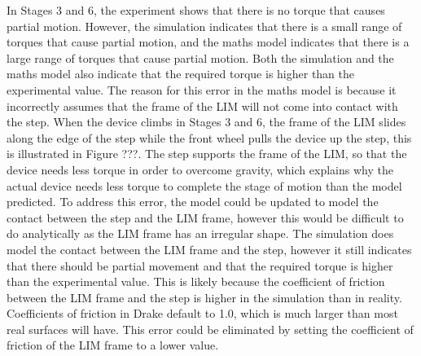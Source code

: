 In Stages 3 and 6, the experiment shows that there is no torque that causes partial motion. However, the simulation indicates that there is a small range of torques that cause partial motion, and the maths model indicates that there is a large range of torques that cause partial motion. Both the simulation and the maths model also indicate that the required torque is higher than the experimental value. The reason for this error in the maths model is because it incorrectly assumes that the frame of the LIM will not come into contact with the step. When the device climbs in Stages 3 and 6, the frame of the LIM slides along the edge of the step while the front wheel pulls the device up the step, this is illustrated in Figure ???. The step supports the frame of the LIM, so that the device needs less torque in order to overcome gravity, which explains why the actual device needs less torque to complete the stage of motion than the model predicted. To address this error, the model could be updated to model the contact between the step and the LIM frame, however this would be difficult to do analytically as the LIM frame has an irregular shape. The simulation does model the contact between the LIM frame and the step, however it still indicates that there should be partial movement and that the required torque is higher than the experimental value. This is likely because the coefficient of friction between the LIM frame and the step is higher in the simulation than in reality. Coefficients of friction in Drake default to 1.0, which is much larger than most real surfaces will have. This error could be eliminated by setting the coefficient of friction of the LIM frame to a lower value. \\

